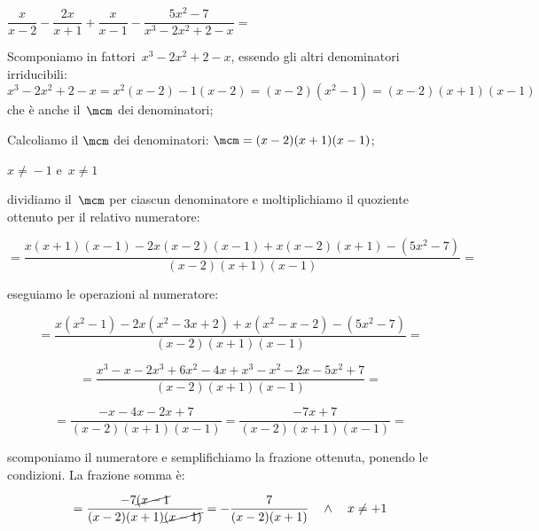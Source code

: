  \begin{esempio}
\(\dfrac{x}{x-2}-\dfrac{2x}{x+1}+
\dfrac{x}{x-1}-\dfrac{5x^{2}-7}{x^{3}-2x^{2}+2-x}=\)
\begin{enumeratea}
 \item Scomponiamo in fattori~\(x^{3}-2x^{2}+2-x\), 
  essendo gli altri denominatori irriducibili: 
  \(x^{3}-2x^{2}+2-x=x^2(x-2)-1(x-2)=(x-2)\left(x^2-1\right)=
   (x-2)(x+1)(x-1)\) che è anche il~\(\mcm\) dei denominatori;

 \item Calcoliamo il \(\mcm\) dei denominatori: 
  \(\mcm=(x-2)(x+1)(x-1)\);
  
\({x\neq}-1\) e~\({x\neq}1\)
 \item dividiamo il~\(\mcm\) per ciascun denominatore e moltiplichiamo il 
  quoziente ottenuto per il relativo numeratore:
  
 \[=\frac{x(x+1)(x-1)-2x(x-2)(x-1)+x(x-2)(x+1)-(5x^{2}-7)}{(x-2)(x+1)(x-1)}=\]
 
 
 \item eseguiamo le operazioni al numeratore:
 
  \[=\frac{x(x^2-1)-2x(x^2-3x+2)+x(x^2-x-2)-(5x^{2}-7)}{(x-2)(x+1)(x-1)} = \]
  
  \[=\frac{x^3-x-2x^3+6x^2-4x+x^3-x^2-2x-5x^2+7}{(x-2)(x+1)(x-1)}=\]
 
  \[=\frac{-x-4x-2x+7}{(x-2)(x+1)(x-1)}=\frac{-7x+7}{(x-2)(x+1)(x-1)}=\]
 
 \item scomponiamo il numeratore e semplifichiamo la frazione ottenuta, 
  ponendo le condizioni. La frazione somma è:
 
  \[=\frac{-7\cancel{(x-1}}{(x-2)(x+1)\cancel{(x-1)}}=
    -{\frac{7}{(x-2)(x+1)}} \quad \wedge \quad x \neq +1\]
 
 \end{enumeratea}
 \end{esempio}

